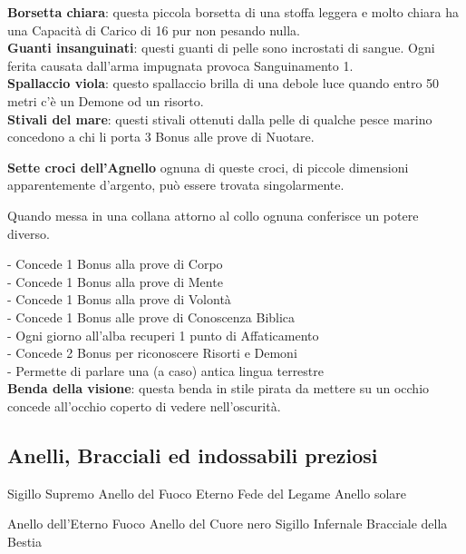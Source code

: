 \documentclass[a4paper,twoside,openany]{book}
\begin{document}
\begin{multicols}{2}
\textbf{Borsetta chiara}: questa piccola borsetta di una stoffa leggera e molto chiara ha una Capacità di Carico di 16 pur non pesando nulla.\\

\textbf{Guanti insanguinati}: questi guanti di pelle sono incrostati di sangue. Ogni ferita causata dall'arma impugnata provoca Sanguinamento 1.\\

\textbf{Spallaccio viola}: questo spallaccio brilla di una debole luce quando entro 50 metri c'è un Demone od un risorto.\\

\textbf{Stivali del mare}: questi stivali ottenuti dalla pelle di qualche pesce marino concedono a chi li porta 3 Bonus alle prove di Nuotare.

\textbf{Sette croci dell'Agnello} ognuna di queste croci, di piccole dimensioni apparentemente d'argento, può essere trovata singolarmente.

Quando messa in una collana attorno al collo ognuna conferisce un potere diverso.

- Concede 1 Bonus alla prove di Corpo\\
- Concede 1 Bonus alla prove di Mente\\
- Concede 1 Bonus alla prove di Volontà\\
- Concede 1 Bonus alle prove di Conoscenza Biblica\\
- Ogni giorno all'alba recuperi 1 punto di Affaticamento\\
- Concede 2 Bonus per riconoscere Risorti e Demoni\\
- Permette di parlare una (a caso) antica lingua terrestre\\

\textbf{Benda della visione}: questa benda in stile pirata da mettere su un occhio concede all'occhio coperto di vedere nell'oscurità.

\subsection{Anelli, Bracciali ed indossabili preziosi}
Sigillo Supremo
Anello del Fuoco Eterno
Fede del Legame
Anello solare

Anello dell'Eterno Fuoco
Anello del Cuore nero
Sigillo Infernale
Bracciale della Bestia


\end{multicols}
\end{document}
